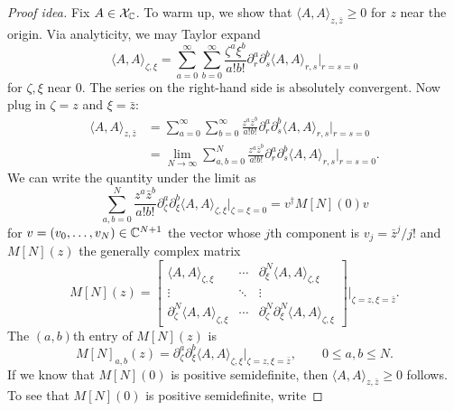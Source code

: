 \begin{proof}[Proof idea]
Fix $A\in\mathcal{X}_{\mathbb{C}}$.
To warm up, we show that $\langle A,A\rangle_{z,\bar z}\geq0$
for $z$ near the origin. Via analyticity, we may Taylor expand
\begin{equation}
 \langle A,A\rangle_{\zeta,\xi}
 =\sum_{a=0}^\infty\sum_{b=0}^\infty
 \frac{\zeta^a\xi^b}{a!b!}
 \partial_r^a\partial_s^b\langle A,A\rangle_{r,s}
 \Big|_{r=s=0}
\end{equation}
for $\zeta,\xi$ near $0$. The series on the right-hand side is
absolutely convergent. Now plug in $\zeta=z$ and $\xi=\bar z$:
\begin{equation}
\begin{split}
 \langle A,A\rangle_{z,\bar z}
 &=\sum_{a=0}^\infty\sum_{b=0}^\infty
 \frac{z^a\bar z^b}{a!b!}
 \partial_r^a\partial_s^b\langle A,A\rangle_{r,s}
 \Big|_{r=s=0}\\
 &=\lim_{N\to\infty}\sum_{a,b=0}^N
 \frac{z^a\bar z^b}{a!b!}
 \partial_r^a\partial_s^b\langle A,A\rangle_{r,s}
 \Big|_{r=s=0}.
\end{split}
\end{equation}
We can write the quantity under the limit as
\begin{equation}
 \sum_{a,b=0}^N\frac{z^a\bar z^b}{a!b!}
 \partial_\zeta^a\partial_\xi^b
 \langle A,A\rangle_{\zeta,\xi}\Big|_{\zeta=\xi=0}
 =v^\dagger M[N](0)v
\end{equation}
for $v=(v_0,\dots,v_N)\in\mathbb{C}^{N+1}$ the vector whose $j$th
component is $v_j=\bar z^j/j!$ and $M[N](z)$ the generally complex
matrix
\begin{equation}
 M[N](z)=
 \begin{bmatrix}
 \langle A,A\rangle_{\zeta,\xi}&\cdots&
   \partial_\xi^N\langle A,A\rangle_{\zeta,\xi}\\
 \vdots&\ddots&\vdots\\
 \partial_\zeta^N\langle A,A\rangle_{\zeta,\xi}&\cdots&
   \partial_\zeta^N\partial_\xi^N\langle A,A\rangle_{\zeta,\xi}
 \end{bmatrix}\Bigg|_{\zeta=z,\xi=\bar z}.
\end{equation}
The $(a,b)$th entry of $M[N](z)$ is
\begin{equation}\label{eq:reflection-derivative-matrices}
 M[N]_{a,b}(z)=\partial_\zeta^a\partial_\xi^b
 \langle A,A\rangle_{\zeta,\xi}\Big|_{\zeta=z,\xi=\bar z},
 \qquad0\leq a,b\leq N.
\end{equation}
If we know that $M[N](0)$ is positive semidefinite, then
$\langle A,A\rangle_{z,\bar z}\geq0$ follows.
To see that $M[N](0)$ is positive semidefinite, write

\end{proof}
